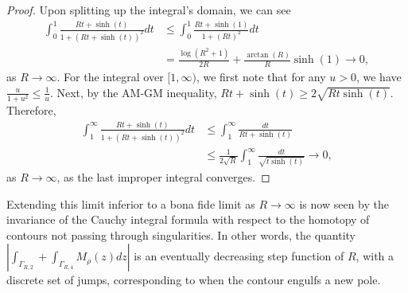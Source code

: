 \documentclass{amsart}
\theoremstyle{plain}
\numberwithin{theorem}{section}
\theoremstyle{definition}
\theoremstyle{remark}
\theoremstyle{brakets}
\begin{document}
\begin{proof}
Upon splitting up the integral's domain, we can see
\begin{align*}
    \int_0^1 \frac{Rt + \sinh(t)}{1 + (Rt + \sinh(t))^2}dt &\leq \int_0^1 \frac{Rt + \sinh(1)}{1 + (Rt)^2} dt\\
    &= \frac{\log(R^2 + 1)}{2R} + \frac{\arctan(R)}{R}\sinh(1) \to 0,
\end{align*}
\noindent as $R \to \infty$. For the integral over $[1,\infty)$, we first note that for any $u > 0$, we have $\frac{u}{1+u^2} \leq \frac{1}{u}$. Next, by the AM-GM inequality, $Rt + \sinh(t) \geq 2\sqrt{Rt\sinh(t)}$. Therefore, 
\begin{align*}
    \int_1^{\infty} \frac{Rt + \sinh(t)}{1 + (Rt + \sinh(t))^2}dt &\leq \int_1^{\infty} \frac{dt}{Rt + \sinh(t)}\\
    &\leq \frac{1}{2\sqrt{R}} \int_1^{\infty} \frac{dt}{\sqrt{t\sinh(t)}} \to 0,
\end{align*}
\noindent as $R \to \infty$, as the last improper integral converges.
\end{proof}

Extending this limit inferior to a bona fide limit as $R \to \infty$ is now seen by the invariance of the Cauchy integral formula with respect to the homotopy of contours not passing through singularities. In other words, the quantity $\left| \int_{\Gamma_{R,2}} + \int_{\Gamma_{R,4}} M_\rho(z)dz \right|$ is an eventually decreasing step function of $R$, with a discrete set of jumps, corresponding to when the contour engulfs a new pole. 
\end{document}
